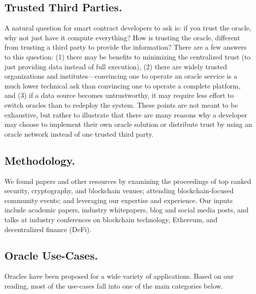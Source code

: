 \subsection{Trusted Third Parties.} A natural question for smart contract developers to ask is: if you trust the oracle, why not just have it compute everything? How is trusting the oracle, different from trusting a third party to provide the information? There are a few answers to this question: (1) there may be benefits to minimizing the centralized trust (\ie to just providing data instead of full execution), (2) there are widely trusted organizations and institutes---convincing one to operate an oracle service is a much lower technical ask than convincing one to operate a complete platform, and (3) if a data source becomes untrustworthy, it may require less effort to switch oracles than to redeploy the system. These points are not meant to be exhaustive, but rather to illustrate that there are many reasons why a developer may choose to implement their own oracle solution or distribute trust by using an oracle network instead of one trusted third party. 

\subsection{Methodology.} We found papers and other resources by examining the proceedings of top ranked security, cryptography, and blockchain venues; attending blockchain-focused community events; and leveraging our expertise and experience. Our inputs include academic papers, industry whitepapers, blog and social media posts, and talks at industry conferences on blockchain technology, Ethereum, and decentralized finance (DeFi). %


\subsection{Oracle Use-Cases.} Oracles have been proposed for a wide variety of applications. Based on our reading, most of the use-cases fall into one of the main categories below.

